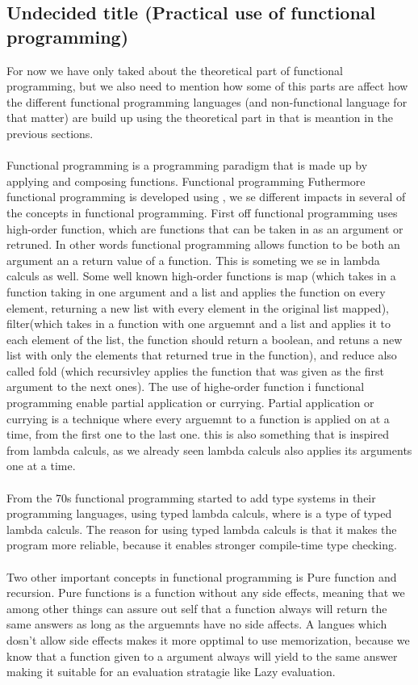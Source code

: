 \subsection{Undecided title (Practical use of functional programming)}
For now we have only taked about the theoretical part of functional programming, but we also need to mention how some of this parts 
are affect how the different functional programming languages (and non-functional language for that matter) are build up using the theoretical
part in that is meantion in the previous sections.
\\ \\
Functional programming is a programming paradigm that is made up by applying and composing functions. Functional programming
Futhermore functional programming is developed  using , we se  different impacts in several
of the concepts in functional programming. First off functional programming uses high-order function, which are functions that can be taken in as 
an argument or retruned. In other words functional programming allows function to be both an argument an a return value of a function. This is someting 
we se in lambda calculs as well. Some well known high-order functions is map (which takes in a function taking in one argument and a list and applies the function on every element, returning 
a new list with every element in the original list mapped), 
filter(which takes in a function with one arguemnt and a list and applies it to each element of the list, the function should return a boolean, and retuns a new list with only the elements
that returned true in the function), and reduce also called fold (which recursivley applies the function that was given as the first argument to the next ones). 
The use of highe-order function i functional programming enable partial application or currying. Partial application or currying is a technique
where every arguemnt to a function is applied on at a time, from the first one to the last one. this is also something that is inspired from
lambda calculs, as we already seen lambda calculs also applies its arguments one at a time.
\\ \\
From the 70s functional programming started to add type systems in their programming languages,
using typed lambda calculs, where  is a type of typed lambda calculs. 
The reason for using typed lambda calculs is that it makes the program more reliable, because it enables stronger compile-time 
type checking.  
\\ \\
Two other important concepts in functional programming is Pure function and recursion. Pure functions is a function without any side effects, meaning 
that we among other things can assure out self that a function always will return the same answers as long as the arguemnts have no side affects. A langues which dosn't allow 
side effects makes it more opptimal to use memorization, because we know that a function given to a argument always will yield to the same answer 
making it suitable for an evaluation stratagie like Lazy evaluation.